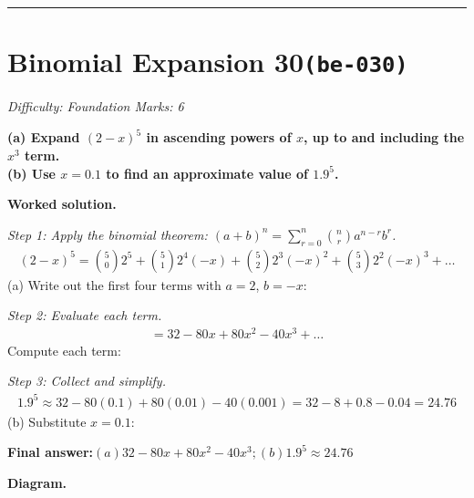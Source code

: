 \documentclass[11pt]{article}
\newcommand{\question}[1]{\par\medskip\noindent\textbf{#1}\par}
\begin{document}
\medskip\hrule

\section*{Binomial Expansion 30\quad\small\texttt{(be-030)}}
\textit{Difficulty: Foundation \quad\textbar\quad Marks: 6}

\question{(a) Expand \( (2 - x)^5 \) in ascending powers of \( x \), up to and including the \( x^3 \) term. \\[3pt] (b) Use \( x = 0.1 \) to find an approximate value of \( 1.9^5 \).}

\textbf{Worked solution.}

\textit{Step 1: Apply the binomial theorem: \((a+b)^n = \sum_{r=0}^{n} \binom{n}{r} a^{n-r} b^r\).}
\[\begin{gathered}
(2-x)^5 = \binom{5}{0}2^5 + \binom{5}{1}2^4(-x) + \binom{5}{2}2^3(-x)^2 + \binom{5}{3}2^2(-x)^3 + \ldots
\end{gathered}\]
(a) Write out the first four terms with \(a=2\), \(b=-x\):

\textit{Step 2: Evaluate each term.}
\[\begin{gathered}
= 32 - 80x + 80x^2 - 40x^3 + \ldots
\end{gathered}\]
Compute each term:

\textit{Step 3: Collect and simplify.}
\[\begin{gathered}
1.9^5 \approx 32 - 80(0.1) + 80(0.01) - 40(0.001) = 32 - 8 + 0.8 - 0.04 = 24.76
\end{gathered}\]
(b) Substitute \(x = 0.1\):

\begin{answerbox}
\textbf{Final answer:}\quad \(\displaystyle (a) 32 - 80x + 80x^2 - 40x^3; (b) 1.9^5 \approx 24.76\)
\end{answerbox}
\textbf{Diagram.}
\end{document}
